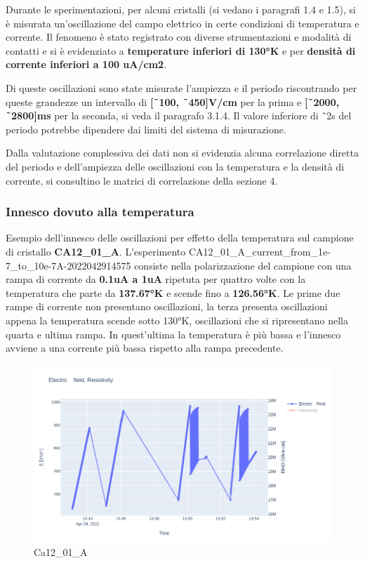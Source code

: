 \documentclass[11pt]{article}
\begin{document}
Durante le sperimentazioni, per alcuni cristalli (si vedano i paragrafi
1.4 e 1.5), si è misurata un'oscillazione del campo elettrico in certe
condizioni di temperatura e corrente. Il fenomeno è stato registrato con
diverse strumentazioni e modalità di contatti e si è evidenziato a
\textbf{temperature inferiori di 130°K} e per \textbf{densità di
corrente inferiori a 100 uA/cm2}.

Di queste oscillazioni sono state misurate l'ampiezza e il periodo
riscontrando per queste grandezze un intervallo di \textbf{{[}˜100,
˜450{]}V/cm} per la prima e \textbf{{[}˜2000, ˜2800{]}ms} per la
seconda, si veda il paragrafo 3.1.4. Il valore inferiore di ˜2s del
periodo potrebbe dipendere dai limiti del sistema di misurazione.

Dalla valutazione complessiva dei dati non si evidenzia alcuna
correlazione diretta del periodo e dell'ampiezza delle oscillazioni con
la temperatura e la densità di corrente, si consultino le matrici di
correlazione della sezione 4.

    \hypertarget{innesco-dovuto-alla-temperatura}{%
\subsubsection{Innesco dovuto alla
temperatura}\label{innesco-dovuto-alla-temperatura}}

Esempio dell'innesco delle oscillazioni per effetto della temperatura
sul campione di cristallo \textbf{CA12\_01\_A}. L'esperimento
CA12\_01\_A\_current\_from\_1e-7\_to\_10e-7A-2022042914575 consiste
nella polarizzazione del campione con una rampa di corrente da
\textbf{0.1uA a 1uA} ripetuta per quattro volte con la temperatura che
parte da \textbf{137.67°K} e scende fino a \textbf{126.56°K}. Le prime
due rampe di corrente non presentano oscillazioni, la terza presenta
oscillazioni appena la temperatura scende sotto 130°K, oscillazioni che
si ripresentano nella quarta e ultima rampa. In quest'ultima la
temperatura è più bassa e l'innesco avviene a una corrente più bassa
rispetto alla rampa precedente.

\begin{figure}
\centering
\includegraphics{ca12_01_a-e.png}
\caption{Ca12\_01\_A}
\end{figure}
\end{document}

